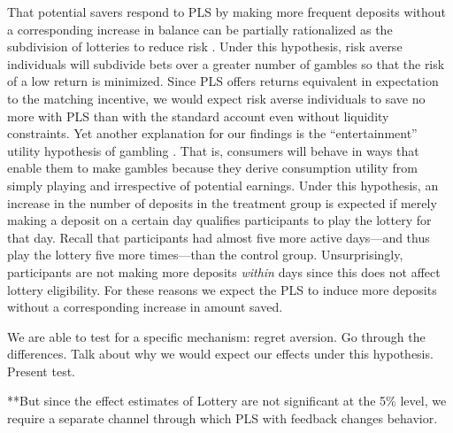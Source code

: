 \documentclass[11pt]{article}
\begin{document}
		That potential savers respond to PLS by making more frequent deposits without a corresponding increase in balance can be partially rationalized as the subdivision of lotteries to reduce risk \parencite{samuelson_risk_1963}. Under this hypothesis, risk averse individuals will subdivide bets over a greater number of gambles so that the risk of a low return is minimized. Since PLS offers returns equivalent in expectation to the matching incentive, we would expect risk averse individuals to save no more with PLS than with the standard account even without liquidity constraints. Yet another explanation for our findings is the ``entertainment'' utility hypothesis of gambling \parencite{conlisk_utility_1993}. That is, consumers will behave in ways that enable them to make gambles because they derive consumption utility from simply playing and irrespective of potential earnings. Under this hypothesis, an increase in the number of deposits in the treatment group is expected if merely making a deposit on a certain day qualifies participants to play the lottery for that day. Recall that participants had almost five more active days---and thus play the lottery five more times---than the control group. Unsurprisingly, participants are not making more deposits \textit{within} days since this does not affect lottery eligibility. For these reasons we expect the PLS to induce more deposits without a corresponding increase in amount saved.

		We are able to test for a specific mechanism: regret aversion.
		Go through the differences. Talk about why we would expect our effects under this hypothesis. Present test.

		**But since the effect estimates of Lottery are not significant at the 5\% level, we require a separate channel through which PLS with feedback changes behavior.




\end{document}
